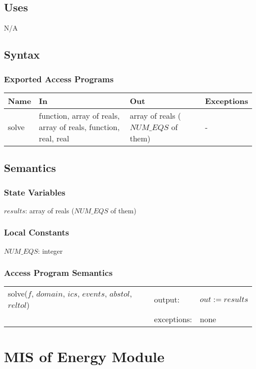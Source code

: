 \documentclass[12pt]{article}
\begin{document}
\subsection{Uses}
N/A
\subsection{Syntax}
\subsubsection{Exported Access Programs}
\begin{center}
\begin{tabular}{p{2cm} p{5cm} p{5cm} p{2cm}}
\hline
\textbf{Name} & \textbf{In} & \textbf{Out} & \textbf{Exceptions} \\
\hline
solve & function, array of reals, array of reals, function, real, real & array of reals ($NUM\_EQS$ of them) & - \\
\hline 
\end{tabular}
\end{center}
\subsection{Semantics}
\subsubsection{State Variables}
$results$: array of reals ($NUM\_EQS$ of them)
\subsubsection{Local Constants}
$NUM\_EQS$: integer
\subsubsection{Access Program Semantics}
\begin{center}
\begin{tabular}{l l p{10cm}}
solve($f$, $domain$, $ics$, $events$, $abstol$, $reltol$) & output: & $out := results$ \\
& exceptions: & none \\
\end{tabular}
\end{center}

\section{MIS of Energy Module} \label{Energy}
\end{document}
